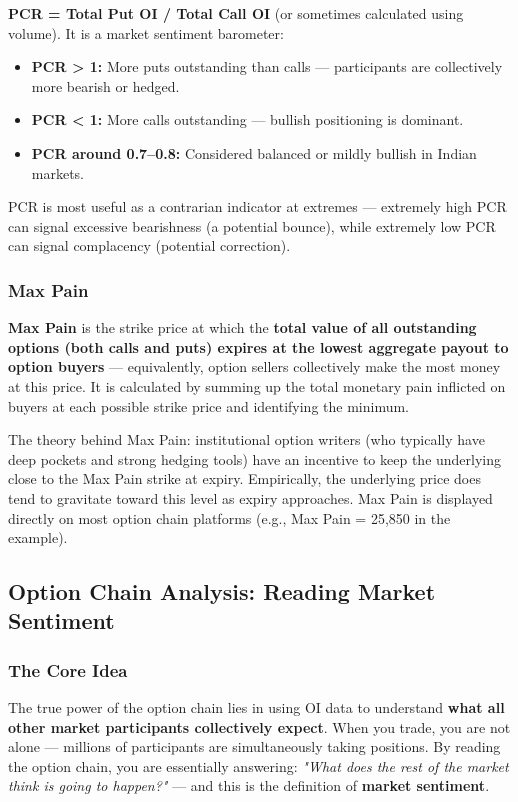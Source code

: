 \documentclass[12pt,openany]{book}
\begin{document}
\textbf{PCR = Total Put OI / Total Call OI} (or sometimes calculated using volume). It is a market sentiment barometer:

\begin{itemize}[leftmargin=*]
    \item \textbf{PCR > 1:} More puts outstanding than calls — participants are collectively more bearish or hedged.
    \item \textbf{PCR < 1:} More calls outstanding — bullish positioning is dominant.
    \item \textbf{PCR around 0.7–0.8:} Considered balanced or mildly bullish in Indian markets.
\end{itemize}

PCR is most useful as a contrarian indicator at extremes — extremely high PCR can signal excessive bearishness (a potential bounce), while extremely low PCR can signal complacency (potential correction).

\subsubsection{Max Pain}

\textbf{Max Pain} is the strike price at which the \textbf{total value of all outstanding options (both calls and puts) expires at the lowest aggregate payout to option buyers} — equivalently, option sellers collectively make the most money at this price. It is calculated by summing up the total monetary pain inflicted on buyers at each possible strike price and identifying the minimum.

The theory behind Max Pain: institutional option writers (who typically have deep pockets and strong hedging tools) have an incentive to keep the underlying close to the Max Pain strike at expiry. Empirically, the underlying price does tend to gravitate toward this level as expiry approaches. Max Pain is displayed directly on most option chain platforms (e.g., Max Pain = 25,850 in the example).


\subsection{Option Chain Analysis: Reading Market Sentiment}

\subsubsection{The Core Idea}

The true power of the option chain lies in using OI data to understand \textbf{what all other market participants collectively expect}. When you trade, you are not alone — millions of participants are simultaneously taking positions. By reading the option chain, you are essentially answering: \emph{"What does the rest of the market think is going to happen?"} — and this is the definition of \textbf{market sentiment}.
\end{document}
